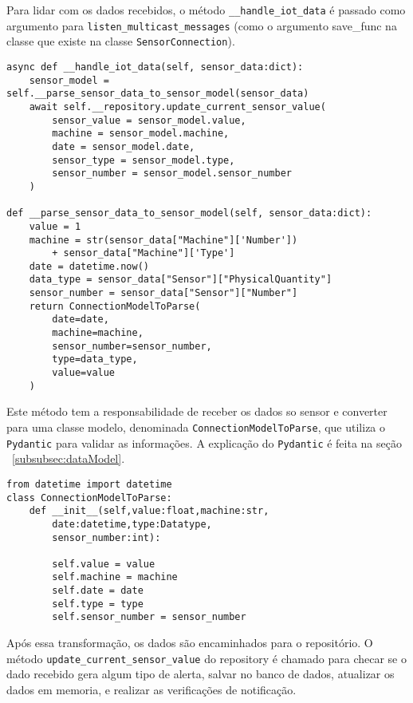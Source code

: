 Para lidar com os dados recebidos, o método \texttt{\_\_handle\_iot\_data} é passado como argumento para \texttt{listen\_multicast\_messages} (como o argumento save\_func na classe que existe na classe \texttt{SensorConnection}).

\begin{verbatim}
async def __handle_iot_data(self, sensor_data:dict):
    sensor_model = self.__parse_sensor_data_to_sensor_model(sensor_data)
    await self.__repository.update_current_sensor_value(
        sensor_value = sensor_model.value,
        machine = sensor_model.machine,
        date = sensor_model.date,
        sensor_type = sensor_model.type,
        sensor_number = sensor_model.sensor_number
    )

def __parse_sensor_data_to_sensor_model(self, sensor_data:dict):
    value = 1
    machine = str(sensor_data["Machine"]['Number']) 
        + sensor_data["Machine"]['Type']
    date = datetime.now()
    data_type = sensor_data["Sensor"]["PhysicalQuantity"]
    sensor_number = sensor_data["Sensor"]["Number"]
    return ConnectionModelToParse(
        date=date,
        machine=machine,
        sensor_number=sensor_number,
        type=data_type,
        value=value
    )
\end{verbatim}

Este método tem a responsabilidade de receber os dados so sensor e converter para uma classe modelo, denominada \texttt{ConnectionModelToParse}, que utiliza o \texttt{Pydantic} para validar as informações. A explicação do \texttt{Pydantic} é feita na seção ~\ref{subsubsec:dataModel}.

\begin{verbatim}
from datetime import datetime
class ConnectionModelToParse:
    def __init__(self,value:float,machine:str,
        date:datetime,type:Datatype,
        sensor_number:int):

        self.value = value
        self.machine = machine
        self.date = date
        self.type = type
        self.sensor_number = sensor_number
\end{verbatim}

Após essa transformação, os dados são encaminhados para o repositório. O método \texttt{update\_current\_sensor\_value} do repository é chamado para checar se o dado recebido gera algum tipo de alerta, salvar no banco de dados, atualizar os dados em memoria, e realizar as verificações de notificação.

